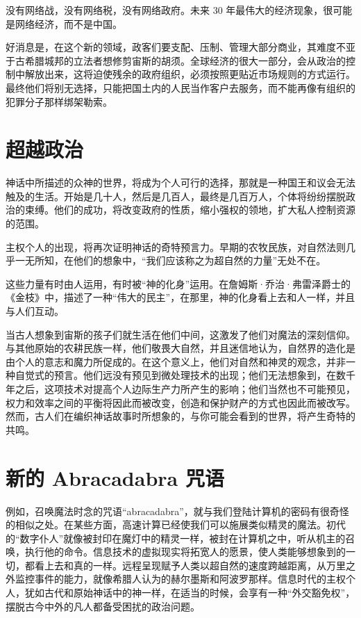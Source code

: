 没有网络战，没有网络税，没有网络政府。未来 30 年最伟大的经济现象，很可能是网络经济，而不是中国。


好消息是，在这个新的领域，政客们要支配、压制、管理大部分商业，其难度不亚于古希腊城邦的立法者想修剪宙斯的胡须。全球经济的很大一部分，会从政治的控制中解放出来，这将迫使残余的政府组织，必须按照更贴近市场规则的方式运行。最终他们将别无选择，只能把国土内的人民当作客户去服务，而不能再像有组织的犯罪分子那样绑架勒索。



\section{超越政治}
神话中所描述的众神的世界，将成为个人可行的选择，那就是一种国王和议会无法触及的生活。开始是几十人，然后是几百人，最终是几百万人，个体将纷纷摆脱政治的束缚。他们的成功，将改变政府的性质，缩小强权的领地，扩大私人控制资源的范围。


主权个人的出现，将再次证明神话的奇特预言力。早期的农牧民族，对自然法则几乎一无所知，在他们的想象中，“我们应该称之为超自然的力量”无处不在。


这些力量有时由人运用，有时被“神的化身”运用。在詹姆斯·乔治·弗雷泽爵士的《金枝》中，描述了一种“伟大的民主”，在那里，神的化身看上去和人一样，并且与人们互动。


当古人想象到宙斯的孩子们就生活在他们中间，这激发了他们对魔法的深刻信仰。与其他原始的农耕民族一样，他们敬畏大自然，并且迷信地认为，自然界的造化是由个人的意志和魔力所促成的。在这个意义上，他们对自然和神灵的观念，并非一种自觉式的预言。他们远没有预见到微处理技术的出现；他们无法想象到，在数千年之后，这项技术对提高个人边际生产力所产生的影响；他们当然也不可能预见，权力和效率之间的平衡将因此而被改变，创造和保护财产的方式也因此而被改写。然而，古人们在编织神话故事时所想象的，与你可能会看到的世界，将产生奇特的共鸣。



\section{新的 Abracadabra 咒语}
例如，召唤魔法时念的咒语“abracadabra”，就与我们登陆计算机的密码有很奇怪的相似之处。在某些方面，高速计算已经使我们可以施展类似精灵的魔法。初代的“数字仆人”就像被封印在魔灯中的精灵一样，被封在计算机之中，听从机主的召唤，执行他的命令。信息技术的虚拟现实将拓宽人的愿景，使人类能够想象到的一切，都看上去和真的一样。远程呈现赋予人类以超自然的速度跨越距离，从万里之外监控事件的能力，就像希腊人认为的赫尔墨斯和阿波罗那样。信息时代的主权个人，犹如古代和原始神话中的神一样，在适当的时候，会享有一种“外交豁免权”，摆脱古今中外的凡人都备受困扰的政治问题。



